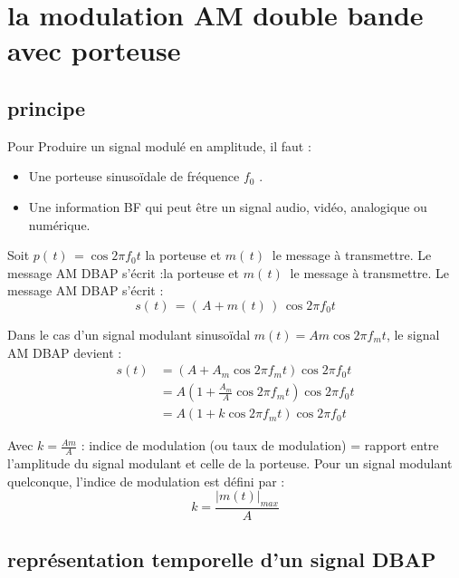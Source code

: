 \documentclass[12pt,a4paper,hidelinks,oneside]{book}
\begin{document}
\section{la modulation AM double bande avec porteuse}
\subsection{principe}
Pour Produire un signal modulé en amplitude, il faut :

\begin{itemize}
	\item Une porteuse sinusoïdale de fréquence $f_{0}$ .
	\item Une information BF qui peut être un signal audio, vidéo, analogique ou numérique.
\end{itemize}

Soit $p(\,t)\,=\cos2\pi f_{0}t$ la porteuse et $m(\,t)\ $ le message à transmettre. Le message AM DBAP s’écrit :la porteuse et $m(\,t)\ $ le message à transmettre. Le message AM DBAP s’écrit :
\begin{equation}
s(\,t)\,=(\,A+m(\,t)\,)\,\cos 2\pi f_{0}t
\end{equation}

Dans le cas d’un signal modulant sinusoïdal $m\left(t\right) = Am\cos 2\pi f_{m} t $, le signal AM DBAP devient :
\begin{equation}
\begin{aligned}
s(t) &=\left(A+A_{m} \cos 2 \pi f_{m} t\right) \cos 2 \pi f_{0} t \\
&=A\left(1+\frac{A_{m}}{A} \cos 2 \pi f_{m} t\right) \cos 2 \pi f_{0} t \\
&=A\left(1+k \cos 2 \pi f_{m} t\right) \cos 2 \pi f_{0} t
\end{aligned}
\end{equation}




Avec $k=\frac{Am}{A}$ 
: indice de modulation (ou taux de modulation) = rapport entre l’amplitude du signal
modulant et celle de la porteuse.
Pour un signal modulant quelconque, l’indice de modulation est défini par :
\begin{equation}
k=\frac{\left|m(t)\right|_{max}}{A}
\end{equation}

\subsection{représentation temporelle d’un signal DBAP}
\end{document}
